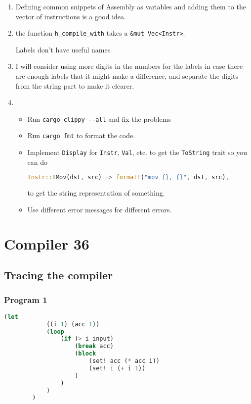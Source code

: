 	\begin{enumerate}
		\item Defining common snippets of Assembly as variables and adding them to the vector of instructions is a good idea.
		\item the function \verb|h_compile_with| takes a \verb|&mut Vec<Instr>|.

			Labels don't have useful names

		\item I will consider using more digits in the numbers for the labels in case there are enough labels that it might make a difference, and separate the digits from the string part to make it clearer.
		\item 
			\begin{itemize}
				\item Run \verb|cargo clippy --all| and fix the problems
				\item Run \verb|cargo fmt| to format the code.
				\item Implement \verb|Display| for \verb|Instr|, \verb|Val|, etc. to get the \verb|ToString| trait so you can do
					\begin{lstlisting}[language=Rust, numbers=none]
        					Instr::IMov(dst, src) => format!("mov {}, {}", dst, src),
					\end{lstlisting}
					to get the string representation of something.
				\item Use different error messages for different errors.
			\end{itemize}

	\end{enumerate}

	
	\chapter*{Compiler 36}

	\section{Tracing the compiler}

	\subsection{Program 1}

	\begin{lstlisting}[language=lisp, title=Factorial]
		(let
			((i 1) (acc 1))
			(loop
				(if (> i input)
					(break acc)
					(block
						(set! acc (* acc i))
						(set! i (+ i 1))
					)
				)
			)
		)
	\end{lstlisting}

